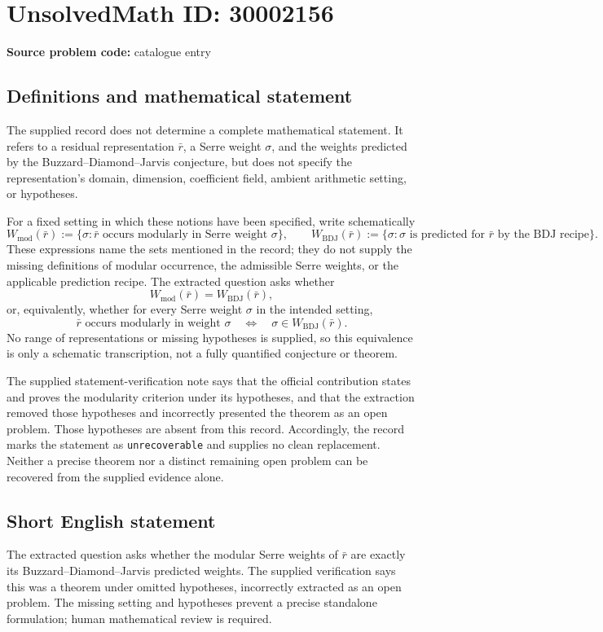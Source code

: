 \documentclass[11pt]{article}
\begin{document}
\section*{UnsolvedMath ID: 30002156}
\textbf{Source problem code:} catalogue entry
\subsection{Definitions and mathematical statement}
The supplied record does not determine a complete mathematical statement. It refers to a residual representation \(\bar r\), a Serre weight \(\sigma\), and the weights predicted by the Buzzard--Diamond--Jarvis conjecture, but does not specify the representation's domain, dimension, coefficient field, ambient arithmetic setting, or hypotheses.

For a fixed setting in which these notions have been specified, write schematically
\[
W_{\mathrm{mod}}(\bar r)
 :=\{\sigma:\bar r\text{ occurs modularly in Serre weight }\sigma\},
\qquad
W_{\mathrm{BDJ}}(\bar r)
 :=\{\sigma:\sigma\text{ is predicted for }\bar r\text{ by the BDJ recipe}\}.
\]
These expressions name the sets mentioned in the record; they do not supply the missing definitions of modular occurrence, the admissible Serre weights, or the applicable prediction recipe. The extracted question asks whether
\[
W_{\mathrm{mod}}(\bar r)=W_{\mathrm{BDJ}}(\bar r),
\]
or, equivalently, whether for every Serre weight \(\sigma\) in the intended setting,
\[
\bar r\text{ occurs modularly in weight }\sigma
\quad\Longleftrightarrow\quad
\sigma\in W_{\mathrm{BDJ}}(\bar r).
\]
No range of representations or missing hypotheses is supplied, so this equivalence is only a schematic transcription, not a fully quantified conjecture or theorem.

The supplied statement-verification note says that the official contribution states and proves the modularity criterion under its hypotheses, and that the extraction removed those hypotheses and incorrectly presented the theorem as an open problem. Those hypotheses are absent from this record. Accordingly, the record marks the statement as \texttt{unrecoverable} and supplies no clean replacement. Neither a precise theorem nor a distinct remaining open problem can be recovered from the supplied evidence alone.
\subsection{Short English statement}
The extracted question asks whether the modular Serre weights of \(\bar r\) are exactly its Buzzard--Diamond--Jarvis predicted weights. The supplied verification says this was a theorem under omitted hypotheses, incorrectly extracted as an open problem. The missing setting and hypotheses prevent a precise standalone formulation; human mathematical review is required.
\end{document}

